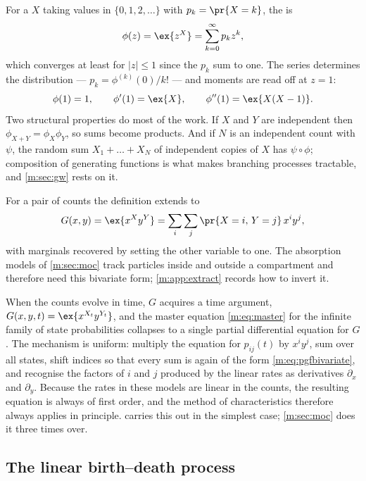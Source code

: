 For a \rv{} $X$ taking values in $\{0,1,2,\dots\}$ with $p_k = \pr{X=k}$, the
\pgf{} is
\begin{equation}
\label{m:eq:pgfdef}
\phi(z) = \ex{z^X} = \sum_{k=0}^{\infty}p_k z^k ,
\end{equation}
which converges at least for $|z|\le1$ since the $p_k$ sum to one. The series
determines the distribution --- $p_k = \phi^{(k)}(0)/k!$ --- and moments are read
off at $z=1$:
\begin{equation}
\label{m:eq:pgfmoments}
\phi(1) = 1,
\qquad
\phi'(1) = \ex{X},
\qquad
\phi''(1) = \ex{X(X-1)} .
\end{equation}
Two structural properties do most of the work. If $X$ and $Y$ are independent then
$\phi_{X+Y} = \phi_X\phi_Y$, so sums become products. And if $N$ is an independent
count with \pgf{} $\psi$, the random sum $X_1+\dots+X_N$ of independent copies of
$X$ has \pgf{} $\psi\circ\phi$; composition of generating functions is what makes
branching processes tractable, and \cref{m:sec:gw} rests on it.

For a pair of counts the definition extends to
\begin{equation}
\label{m:eq:pgfbivariate}
G(x,y) = \ex{x^{X}y^{Y}} = \sum_{i}\sum_{j}\pr{X=i,\,Y=j}\,x^iy^j ,
\end{equation}
with marginals recovered by setting the other variable to one. The absorption
models of \cref{m:sec:moc} track particles inside and outside a compartment and
therefore need this bivariate form; \cref{m:app:extract} records how to invert it.

When the counts evolve in time, $G$ acquires a time argument,
$G(x,y,t) = \ex{x^{X_t}y^{Y_t}}$, and the master equation \cref{m:eq:master} for the
infinite family of state probabilities collapses to a single partial differential
equation for $G$. The mechanism is uniform: multiply the equation for
$p_{ij}(t)$ by $x^iy^j$, sum over all states, shift indices so that every sum is
again of the form \cref{m:eq:pgfbivariate}, and recognise the factors of $i$ and $j$
produced by the linear rates as derivatives $\partial_x$ and $\partial_y$. Because
the rates in these models are linear in the counts, the resulting equation is
always of first order, and the method of characteristics therefore always applies
in principle.  carries this out in the simplest case;
\cref{m:sec:moc} does it three times over.

\subsection{The linear birth--death process}
\label{m:sec:linbd}

